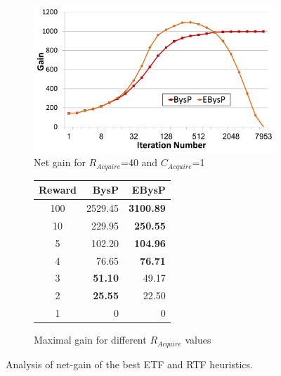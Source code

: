 \documentclass[journal]{IEEEtran}
\begin{document}
\begin{figure}

\centering
\begin{subfigure}{.55\textwidth}
  \centering
\includegraphics[width=\linewidth]{Cost_Iteration.pdf}%

\caption{Net gain for $R_{Acquire}$=40 and $C_{Acquire}$=1}%
\label{fig:CostIteration}
\end{subfigure}%
\quad
\begin{subfigure}{.3\textwidth}
  \centering
\begin{tabular}{c|r|r}
Reward & BysP & EBysP \\\hline
100 & 2529.45 & {\bf 3100.89} \\
10 & 229.95 & {\bf 250.55} \\
5 & 102.20 & {\bf 104.96} \\
4 & 76.65 & {\bf 76.71} \\
3 & \textbf{51.10} & 49.17 \\
2 & \textbf{25.55} & 22.50 \\
1 & 0 & 0 \\
\end{tabular}%
\caption{Maximal gain for different $R_{Acquire}$ values}%
\label{tab:Reward}%
\end{subfigure}

\caption{Analysis of net-gain of the best ETF and RTF heuristics.}
\label{fig:net-gain}
\end{figure}
\end{document}
